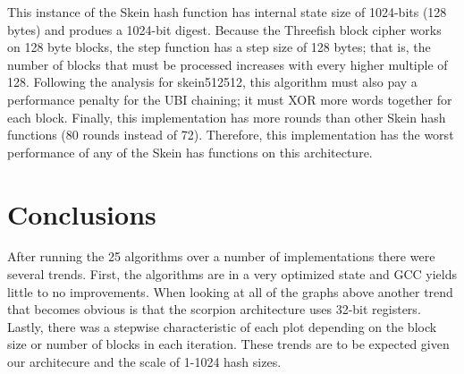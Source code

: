 \documentclass[10pt,a4paper]{article}
\begin{document}
This instance of the Skein hash function has internal state size of 1024-bits (128 bytes) and produes a 1024-bit digest.  Because the Threefish block cipher works on 128 byte blocks, the step function has a step size of 128 bytes; that is, the number of blocks that must be processed increases with every higher multiple of 128.  Following the analysis for skein512512, this algorithm must also pay a performance penalty for the UBI chaining; it must XOR more words together for each block.  Finally, this implementation has more rounds than other Skein hash functions (80 rounds instead of 72).  Therefore, this implementation has the worst performance of any of the Skein has functions on this architecture.

\section*{Conclusions}
After running the 25 algorithms over a number of implementations there were several trends. First, the algorithms are in a very optimized state and 
GCC yields little to no improvements. When looking at all of the graphs above another trend that becomes obvious is that the scorpion architecture uses 
32-bit registers. Lastly, there was a stepwise characteristic of each plot depending on the block size or number of blocks in each iteration. These trends
are to be expected given our architecure and the scale of 1-1024 hash sizes.

{}

\end{document}
